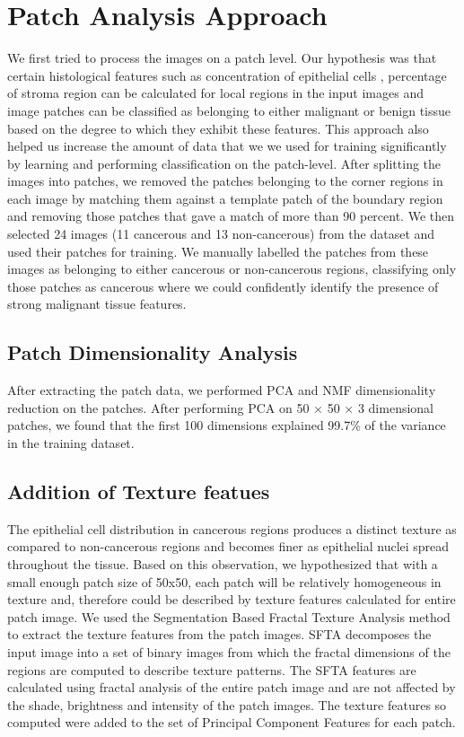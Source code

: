 \section{Patch Analysis Approach}
\label{sec:patch_based_approaches}
We first tried to process the images on a patch level. Our hypothesis was that certain histological features such as concentration of epithelial cells , percentage of stroma region can be calculated for local regions in the input images and image patches can be classified as belonging to either malignant or benign tissue based on the degree to which they exhibit these features. This approach also helped us increase the amount of data that we we used for training significantly by learning and performing classification on the patch-level. After splitting the images into patches, we removed the patches belonging to the corner regions in each image by matching them against a template patch of the boundary region and removing those patches that gave a match of more than 90 percent. We then selected 24 images (11 cancerous and 13 non-cancerous) from the dataset and used their patches for training. We manually labelled the patches from these images as belonging to either cancerous or non-cancerous regions, classifying only those patches as cancerous where we could confidently identify the presence of strong malignant tissue features. 

\subsection{Patch Dimensionality Analysis}
After extracting the patch data, we performed PCA and NMF dimensionality reduction on the patches. After performing PCA on 50 $\times$ 50 $\times$ 3 dimensional patches, we found that the first 100 dimensions explained 99.7\% of the variance in the training dataset. 


\subsection{Addition of Texture featues}
The epithelial cell distribution in cancerous regions produces a distinct texture as compared to non-cancerous regions and becomes finer as epithelial nuclei spread throughout the tissue. Based on this observation, we hypothesized that with a small enough patch size of 50x50, each patch will be relatively homogeneous in texture and, therefore could be described by texture features calculated for entire patch image. We used the Segmentation Based Fractal Texture Analysis method \cite{6382737} to extract the texture features from the patch images. SFTA decomposes the input image into a set of binary images from  which the fractal dimensions of the regions are computed to describe texture patterns. The SFTA features are calculated using fractal analysis of the entire patch image and are not affected by the shade, brightness and intensity of the patch images. The texture features so computed were added to the set of Principal Component Features for each patch.


